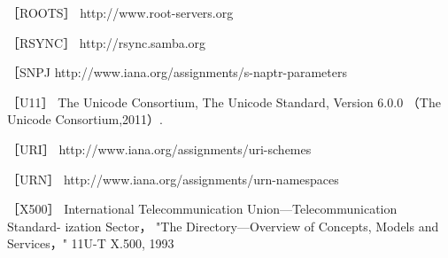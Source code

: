 ［ROOTS］ http://www.root-servers.org

［RSYNC］ http://rsync.samba.org

［SNPJ http://www.iana.org/assignments/s-naptr-parameters

［U11］ The Unicode Consortium, The Unicode Standard, Version 6.0.0 （The Unicode
Consortium,2011）.

［URI］ http://www.iana.org/assignments/uri-schemes

［URN］ http://www.iana.org/assignments/urn-namespaces

［X500］ International Telecommunication Union—Telecommunication Standard-
ization Sector， "The Directory—Overview of Concepts, Models and Services，"
11U-T X.500, 1993
